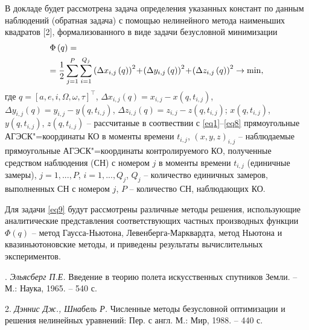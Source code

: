 В докладе будет рассмотрена задача определения указанных констант по данным наблюдений (обратная задача) с помощью нелинейного метода наименьших квадратов [2], формализованного в виде задачи безусловной минимизации
\vskip-7mm
\begin{equation}
\label{eq9}
\begin{gathered}
  \Phi \left( q \right) =  \hfill \\
   = \frac{1}{2}\sum\limits_{j = 1}^P {\sum\limits_{i = 1}^{{Q_j}} {{{\left( {\Delta {x_{i,j}}\left( q \right)} \right)}^2}
\!+\!
{{\left( {\Delta {y_{i,j}}\left( q \right)} \right)}^2}
\!+\!
{{\left( {\Delta {z_{i,j}}\left( q \right)} \right)}^2} \to \min } ,}  \hfill \\
\end{gathered}
\end{equation}
\vskip-5mm
\noindent
где
$q = {\left[ {a,e,i,\Omega ,\omega ,\tau } \right]^{\top}}$,
$\Delta {x_{i,j}}\left( q \right) = {x_{i,j}} \!-\! x\left( {q,{t_{i,j}}} \right)$,
$\Delta {y_{i,j}}\left( q \right) = {y_{i,j}} \!-\! y\left( {q,{t_{i,j}}} \right)$,
$\Delta {z_{i,j}}\left( q \right) = {z_{i,j}} \!-\! z\left( {q,{t_{i,j}}} \right)$;
$x\left( {q,{t_{i,j}}} \right)$,
$y\left( {q,{t_{i,j}}} \right)$,
$z\left( {q,{t_{i,j}}} \right)$ --
рассчитаные в соотвествии с \eqref{eq1}--\eqref{eq8} прямоугольные АГЭСК"=координаты КО в моменты времени
${t_{i,j}}$,
${\left( {x,y,z} \right)_{i,j}}$ --
наблюдаемые прямоугольные АГЭСК"=координаты контролируемого КО,
полученные средством наблюдения (СН) с номером $j$ в моменты времени
${t_{i,j}}$ (единичные замеры),
$j=1,...,P$,
$i=1,...,Q_j$,
$Q_j$ -- количество единичных замеров, выполненных СН с номером $j$,
$P$ -- количество СН, наблюдающих КО.

Для задачи \eqref{eq9} будут рассмотрены различные методы решения, использующие аналитические представления соответствующих частных производных функции
$\Phi \left( q \right)$
 -- метод Гаусса-Ньютона, Левенберга-Марквардта, метод Ньютона и квазиньютоновские методы, и приведены результаты вычислительных экспериментов.

. {\it Эльясберг П.Е.}
 Введение в теорию полета искусственных спутников Земли. – М.: Наука, 1965. – 540 с.

2. {\it Дэннис Дж., Шнабель Р.} Численные методы безусловной оптимизации и решения нелинейных уравнений: Пер. с англ. М.: Мир, 1988. – 440 с.
